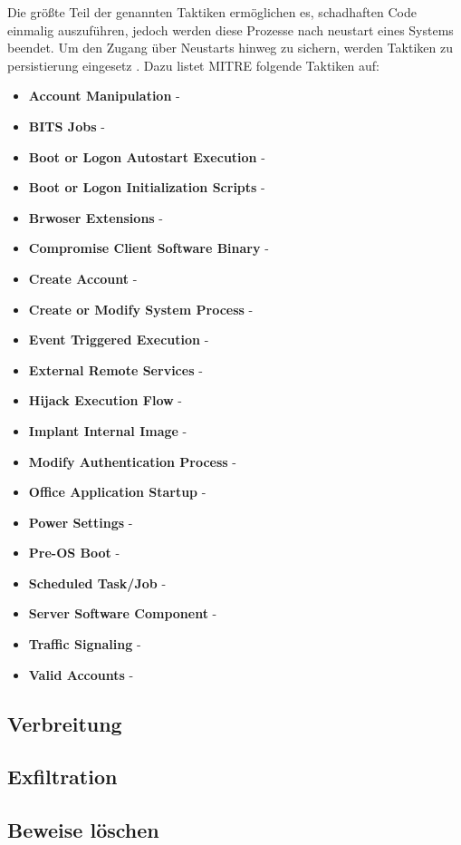 \documentclass[conference]{IEEEtran}
\begin{document}
Die größte Teil der genannten Taktiken ermöglichen es, schadhaften Code einmalig auszuführen, jedoch werden diese Prozesse nach neustart eines Systems beendet.
Um den Zugang über Neustarts hinweg zu sichern, werden Taktiken zu persistierung eingesetz \cite{MITREPersistence}.
Dazu listet MITRE \cite{MITREPersistence} folgende Taktiken auf:
\begin{itemize}
    \item \textbf{Account Manipulation} -
    \item \textbf{BITS Jobs} -
    \item \textbf{Boot or Logon Autostart Execution} -
    \item \textbf{Boot or Logon Initialization Scripts} -
    \item \textbf{Brwoser Extensions} -
    \item \textbf{Compromise Client Software Binary} -
    \item \textbf{Create Account} -
    \item \textbf{Create or Modify System Process} -
    \item \textbf{Event Triggered Execution} -
    \item \textbf{External Remote Services} -
    \item \textbf{Hijack Execution Flow} -
    \item \textbf{Implant Internal Image} -
    \item \textbf{Modify Authentication Process} -
    \item \textbf{Office Application Startup} -
    \item \textbf{Power Settings} -
    \item \textbf{Pre-OS Boot} -
    \item \textbf{Scheduled Task/Job} -
    \item \textbf{Server Software Component} -
    \item \textbf{Traffic Signaling} -
    \item \textbf{Valid Accounts} -
\end{itemize}

\subsection{Verbreitung}
\subsection{Exfiltration}
\subsection{Beweise löschen}
\end{document}
